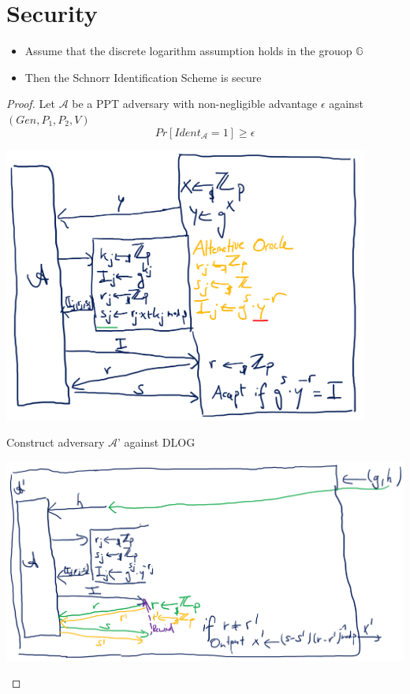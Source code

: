 \section{Security}
    \begin{theorem}\label{thm9.2}
        \begin{itemize}
            \item Assume that the discrete logarithm assumption holds in the grouop $\mathbb{G}$
            \item Then the Schnorr Identification Scheme is secure
        \end{itemize}
    \end{theorem}
    \begin{proof}
        Let $\mathcal{A}$ be a PPT adversary with non-negligible advantage $\epsilon$ against $(Gen,P_1,P_2,V)$
        $$Pr[Ident_{\mathcal{A}}=1] \geq \epsilon$$
        \begin{center}
	        \includegraphics[width=120mm]{Graphics/Digital Signatures/is5.png}
        \end{center}
        Construct adversary $\mathcal{A}$' against DLOG
        \begin{center}
	        \includegraphics[width=140mm]{Graphics/Digital Signatures/is6.png}

\end{center}
\end{proof}
